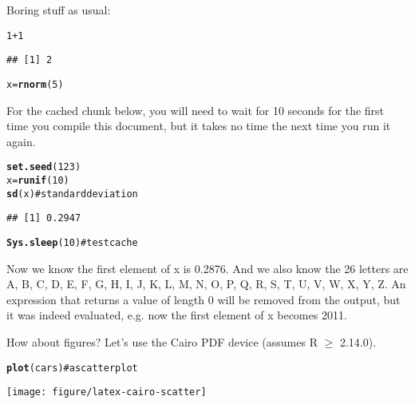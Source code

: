 \documentclass{article}\usepackage{graphicx, color}
\makeatletter
\newcommand{\hlfunctioncall}[1]{\textcolor[rgb]{0.501960784313725,0,0.329411764705882}{\textbf{#1}}}%
\newcommand{\hlcomment}[1]{\textcolor[rgb]{0.180392156862745,0.6,0.341176470588235}{#1}}%
\newenvironment{kframe}{%
 \def\at@end@of@kframe{}%
 \ifinner\ifhmode%
  \def\at@end@of@kframe{\end{minipage}}%
  \begin{minipage}{\columnwidth}%
 \fi\fi%
 \def\FrameCommand##1{\hskip\@totalleftmargin \hskip-\fboxsep
 \colorbox{shadecolor}{##1}\hskip-\fboxsep
     \hskip-\linewidth \hskip-\@totalleftmargin \hskip\columnwidth}%
 \MakeFramed {\advance\hsize-\width
   \@totalleftmargin\z@ \linewidth\hsize
   \@setminipage}}%
 {\par\unskip\endMakeFramed%
 \at@end@of@kframe}
\newenvironment{knitrout}{}{} %
\makeatother
\begin{document}
Boring stuff as usual:

\begin{knitrout}
\color{fgcolor}\begin{kframe}
\begin{alltt}
1 + 1
\end{alltt}
\begin{verbatim}
## [1] 2
\end{verbatim}
\begin{alltt}

x = \hlfunctioncall{rnorm}(5)
\end{alltt}
\end{kframe}
\end{knitrout}


For the cached chunk below, you will need to wait for 10 seconds for
the first time you compile this document, but it takes no time the
next time you run it again.

\begin{knitrout}
\color{fgcolor}\begin{kframe}
\begin{alltt}
\hlfunctioncall{set.seed}(123)
x = \hlfunctioncall{runif}(10)
\hlfunctioncall{sd}(x)  \hlcomment{# standard deviation}
\end{alltt}
\begin{verbatim}
## [1] 0.2947
\end{verbatim}
\begin{alltt}

\hlfunctioncall{Sys.sleep}(10)  \hlcomment{# test cache}
\end{alltt}
\end{kframe}
\end{knitrout}


Now we know the first element of x is 0.2876. And we also know
the 26 letters are A, B, C, D, E, F, G, H, I, J, K, L, M, N, O, P, Q, R, S, T, U, V, W, X, Y, Z. An expression that returns a
value of length 0 will be removed from the output,  but it was indeed evaluated, e.g. now the first element
of x becomes 2011.

How about figures? Let's use the Cairo PDF device (assumes R $\geq$
2.14.0).

\begin{knitrout}
\color{fgcolor}\begin{kframe}
\begin{alltt}
\hlfunctioncall{plot}(cars)  \hlcomment{# a scatter plot}
\end{alltt}
\end{kframe}
\texttt{[image: figure/latex-cairo-scatter]} 

\end{knitrout}
\end{document}
